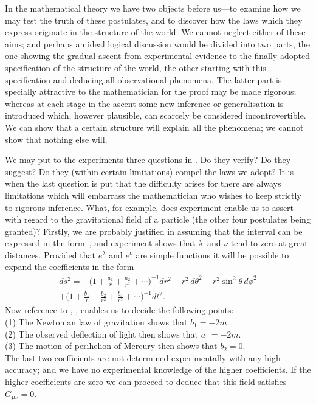 \documentclass[12pt]{book}
\begin{document}
In the mathematical theory we have two objects before us---to examine
how we may test the truth of these postulates, and to discover how the laws
which they express originate in the structure of the world. We cannot neglect
either of these aims; and perhaps an ideal logical discussion would be divided
into two parts, the one showing the gradual ascent from experimental evidence
to the finally adopted specification of the structure of the world, the other
starting with this specification and deducing all observational phenomena.
The latter part is specially attractive to the mathematician for the proof may
be made rigorous; whereas at each stage in the ascent some new inference or
generalisation is introduced which, however plausible, can scarcely be considered
incontrovertible. We can show that a certain structure will explain
all the phenomena; we cannot show that nothing else will.

We may put to the experiments three questions in . Do they
%
%
%
verify? Do they suggest? Do they (within certain limitations) compel the
laws we adopt? It is when the last question is put that the difficulty arises
for there are always limitations which will embarrass the mathematician who
wishes to keep strictly to rigorous inference. What, for example, does experiment
enable us to assert with regard to the gravitational field of a particle
(the other four postulates being granted)? Firstly, we are probably justified
in assuming that the interval can be expressed in the form~, and experiment
shows that $\lambda$~and $\nu$ tend to zero at great distances. Provided that $e^{\lambda}$ and
$e^{\nu}$ are simple functions it will be possible to expand the coefficients in the form
\begin{multline*}
  ds^{2} = -\biggl(1 + \frac{a_{1}}{r} + \frac{a_{2}}{r^{2}} + \cdots\biggr)^{-1} dr^{2}
  - r^{2}\, d\theta^{2} - r^{2}\sin^{2}\theta\, d\phi^{2} \\
  + \biggl(1 + \frac{b_{1}}{r} + \frac{b_{2}}{r^{2}} + \frac{b_{3}}{r^{3}} + \cdots\biggr)^{-1} dt^{2}.
\end{multline*}
Now reference to , ,  enables us to decide the following points: \\
\Indent (1) The Newtonian law of gravitation shows that $b_{1} = -2m$. \\
\Indent (2) The observed deflection of light then shows that $a_{1} = -2m$. \\
\Indent (3) The motion of perihelion of Mercury then shows that $b_{2} = 0$. \\
The last two coefficients are not determined experimentally with any high
accuracy; and we have no experimental knowledge of the higher coefficients.
If the higher coefficients are zero we can proceed to deduce that this field
satisfies $G_{\mu\nu} = 0$.
\end{document}
